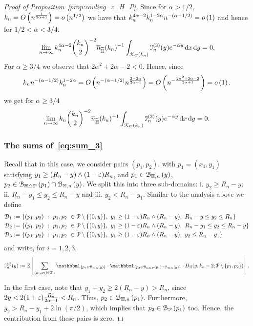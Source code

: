 \begin{proof}[Proof of Proposition~\ref{prop:couling_c_H_P}]
Since for $\alpha > 1/2$, $k_n = O\left(n^{\frac{1}{2\alpha +1}}\right) = o\left(n^{1/2}\right)$ we have that $k_n^{4\alpha - 2} k_n^{1 - 2\alpha} n^{-(\alpha - 1/2)} = o\left(1\right)$ and hence for $1/2 < \alpha < 3/4$.
\[
	\lim_{n \to \infty} k_n^{4\alpha - 2} \binom{k_n}{2}^{-2} \overline{n}_{\widetilde{\mathbb{H}}}(k_n)^{-1} \int_{{\mathcal K}_{C}(k_n)} \mathcal{I}_n^{(3)}(y) e^{-\alpha y} \operatorname{\mathrm{d}\hspace{-2pt}} x \operatorname{\mathrm{d}\hspace{-2pt}} y = 0,
\]
For $\alpha \ge 3/4$ we observe that $2\alpha^2 + 2\alpha - 2 < 0$. Hence, since
\[
 	k_n n^{-(\alpha - 1/2)} k_n^{1-2\alpha} = O\left(n^{-(\alpha - 1/2)} n^{\frac{2 - 2\alpha}{2\alpha + 1}}\right)
 	= O\left(n^{- \frac{2\alpha^2 + 2\alpha - 2}{2\alpha + 1}}\right) = o\left(1\right).
\]
we get for $\alpha \ge 3/4$
\[
	\lim_{n \to \infty} k_n \binom{k_n}{2}^{-2} \overline{n}_{\widetilde{\mathbb{H}}}(k_n)^{-1} \int_{{\mathcal K}_{C}(k_n)} \mathcal{I}_n^{(3)}(y) e^{-\alpha y} \operatorname{\mathrm{d}\hspace{-2pt}} x \operatorname{\mathrm{d}\hspace{-2pt}} y = 0.
\]



\subsubsection*{The sums of~\eqref{eq:sum_3}}
 
Recall that in this case, we consider pairs $(p_1,p_2)$, with $p_1 = (x_1,y_1)$ satisfying 
$y_1 \geq (R_n - y) \wedge (1-\varepsilon)R_n$, and $p_1 \in {\mathcal B}_{\mathbb{H},n}\left(y\right)$, $p_2 \in {\mathcal B}_{\mathbb{H} \bigtriangleup {\mathcal P}}\left(p_1\right) \cap {\mathcal B}_{\mathbb{H},n}\left(y\right)$. 
We split this into three sub-domains:  i. $y_2 \geq R_n - y$; ii. $R_n -y_1 \leq y_2 \leq R_n -y$ and iii. $y_2 < R_n - y_1$. Similar to the analysis above we define
\begin{align*}
	\mathcal{D}_{1} &:= \{(p_1, p_2) \ : \  p_1,p_2 \ \in {\mathcal P} \setminus \{(0,y) \}, \ y_1 \geq (1-\varepsilon) R_n \wedge (R_n-y), 
		\ R_n -y \leq y_2 \leq R_n \}\\
	\mathcal{D}_{2} &:= \{(p_1, p_2) \ : \  p_1,p_2 \ \in {\mathcal P} \setminus \{(0,y) \}, \ y_1 \geq (1-\varepsilon) R_n \wedge (R_n-y), 
		\ R_n -y_1 \leq y_2 \leq R_n - y \}\\
	\mathcal{D}_{3} &:= \{(p_1, p_2) \ : \  p_1,p_2 \ \in {\mathcal P} \setminus \{(0,y) \}, \ y_1 \geq (1-\varepsilon) R_n \wedge (R_n-y), 
		\ y_2 \leq R_n - y_1 \}
\end{align*}
and write, for $i = 1,2,3$,
\[
	\mathcal{I}_n^{(i)}(y) := \Exp { \sum_{(p_1,p_2)  \in \dom{i}} 
	\ind{p_1 \in \BallHyp{y}} \cdot \ind{p_2 \in \BallSym{p_1} \cap \BallHyp{y}}
	\cdot D_\H (y,k_n-2;\Pcal \setminus \{ p_1, p_2\})}.
\]


In the first case, note that $y_1 + y_2 \geq 2(R_n - y) > R_n$, since $2y < 2(1+\varepsilon)
\frac{R_n}{2\alpha +1} < R_n$. Thus, $p_2 \in {\mathcal B}_{\mathbb{H},n}\left(p_1\right)$. Furthermore, 
$y_2 > R_n - y_1 + 2\ln (\pi/2)$, which implies that $p_2 \in {\mathcal B}_{{\mathcal P}}\left(p_1\right)$ too. 
Hence, the contribution from these pairs is zero.   


\end{proof}
